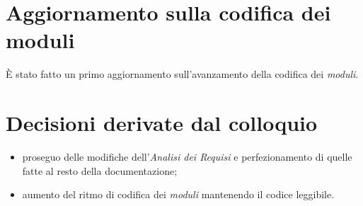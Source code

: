 \section{Aggiornamento sulla codifica dei moduli}
È stato fatto un primo aggiornamento sull'avanzamento della codifica dei \textit{moduli}.


\section{Decisioni derivate dal colloquio}
  \begin{itemize}
    \item proseguo delle modifiche dell'\textit{Analisi dei Requisi} e perfezionamento di quelle fatte al resto della documentazione;
    \item aumento del ritmo di codifica dei \textit{moduli} mantenendo il codice leggibile.
  \end{itemize}

